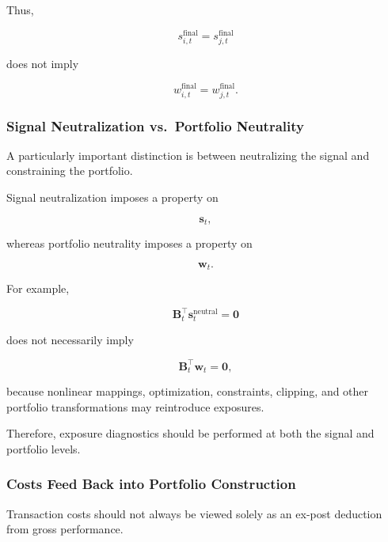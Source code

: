 \documentclass[11pt,a4paper]{article}
\begin{document}
Thus,

\begin{equation}
s_{i,t}^{\mathrm{final}}
=
s_{j,t}^{\mathrm{final}}
\end{equation}

does not imply

\begin{equation}
w_{i,t}^{\mathrm{final}}
=
w_{j,t}^{\mathrm{final}}.
\end{equation}


\subsubsection{Signal Neutralization vs.\ Portfolio Neutrality}

A particularly important distinction is between neutralizing the signal and
constraining the portfolio.

Signal neutralization imposes a property on

\begin{equation}
\mathbf{s}_t,
\end{equation}

whereas portfolio neutrality imposes a property on

\begin{equation}
\mathbf{w}_t.
\end{equation}

For example,

\begin{equation}
\mathbf{B}_t^\top
\mathbf{s}_t^{\mathrm{neutral}}
=
\mathbf{0}
\end{equation}

does not necessarily imply

\begin{equation}
\mathbf{B}_t^\top
\mathbf{w}_t
=
\mathbf{0},
\end{equation}

because nonlinear mappings, optimization, constraints, clipping, and other
portfolio transformations may reintroduce exposures.

Therefore, exposure diagnostics should be performed at both the signal and
portfolio levels.


\subsubsection{Costs Feed Back into Portfolio Construction}

Transaction costs should not always be viewed solely as an ex-post deduction
from gross performance.
\end{document}
